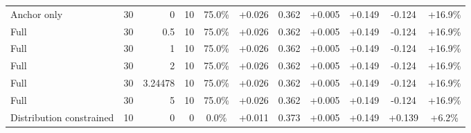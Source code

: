 \begin{table}[htbp]
\begin{tabular}{lrrrccccccc}
Anchor only & 30 & 0 & 10 & 75.0\% & +0.026 & 0.362 & +0.005 & +0.149 & -0.124 & +16.9\% \\
Full & 30 & 0.5 & 10 & 75.0\% & +0.026 & 0.362 & +0.005 & +0.149 & -0.124 & +16.9\% \\
Full & 30 & 1 & 10 & 75.0\% & +0.026 & 0.362 & +0.005 & +0.149 & -0.124 & +16.9\% \\
Full & 30 & 2 & 10 & 75.0\% & +0.026 & 0.362 & +0.005 & +0.149 & -0.124 & +16.9\% \\
Full & 30 & 3.24478 & 10 & 75.0\% & +0.026 & 0.362 & +0.005 & +0.149 & -0.124 & +16.9\% \\
Full & 30 & 5 & 10 & 75.0\% & +0.026 & 0.362 & +0.005 & +0.149 & -0.124 & +16.9\% \\
Distribution constrained & 10 & 0 & 0 & 0.0\% & +0.011 & 0.373 & +0.005 & +0.149 & +0.139 & +6.2\% \\
\bottomrule
\end{tabular}
\end{table}